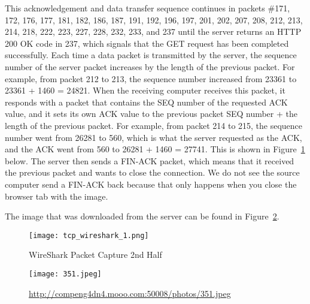 This acknowledgement and data transfer sequence continues in packets \#171, 172, 176, 177, 181, 182, 186, 187, 191, 192,
196, 197, 201, 202, 207, 208, 212, 213, 214, 218, 222, 223, 227, 228, 232, 233, and 237 until the server returns an HTTP
200 OK code in 237, which signals that the GET request has been completed successfully.
Each time a data packet is transmitted by the server, the sequence number of the server packet increases by the length
of the previous packet.
For example, from packet 212 to 213, the sequence number increased from 23361 to 23361 + 1460 = 24821.
When the receiving computer receives this packet, it responds with a packet that contains the SEQ number of the
requested ACK value, and it sets its own ACK value to the previous packet SEQ number + the length of the previous packet.
For example, from packet 214 to 215, the sequence number went from 26281 to 560, which is what the server requested as
the ACK, and the ACK went from 560 to 26281 + 1460 = 27741.
This is shown in Figure~\ref{fig:tcp2} below.
The server then sends a FIN-ACK packet, which means that it received the previous packet and wants to close the connection.
We do not see the source computer send a FIN-ACK back because that only happens when you close the browser tab with the image.

The image that was downloaded from the server can be found in Figure~\ref{fig:mooo}.

\begin{figure}[htp]
    \centering
    \caption[tcp2]{WireShark Packet Capture 2nd Half}\label{fig:tcp2}
    \texttt{[image: tcp\_wireshark\_1.png]}
\end{figure}

\begin{figure}[htp]
    \centering
    \caption[mooo]{\url{http://compeng4dn4.mooo.com:50008/photos/351.jpeg}}\label{fig:mooo}
    \texttt{[image: 351.jpeg]}
\end{figure}
